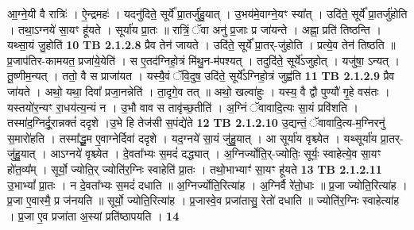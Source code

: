 \documentclass[17pt]{extarticle}
\begin{document}
                  आ॒ग्ने॒यी वै रात्रिः॑ । ऐ॒न्द्रमहः॑ । यदनु॑दिते॒ सूर्ये᳚ प्रा॒तर्जु॑हु॒यात् । उ॒भय॑मे॒वाग्ने॒यꣳ स्या᳚त् । उदि॑ते॒ सूर्ये᳚ प्रा॒तर्जु॑होति । तथा॒ऽग्नये॑ सा॒यꣳ हू॑यते । सूर्या॑य प्रा॒तः ॥ रात्रिं॒ ॅवा अनु॑ प्र॒जाः प्र जा॑यन्ते । अह्ना॒ प्रति॑ तिष्ठन्ति । यथ्सा॒यं जु॒होति॑ \textbf{ 10} \newline
                  \newline
                                \textbf{ TB 2.1.2.8} \newline
                  प्रैव तेन॑ जायते । उदि॑ते॒ सूर्ये᳚ प्रा॒तर्-जु॑होति । प्रत्ये॒व तेन॑ तिष्ठति ॥ प्र॒जाप॑तिर-कामयत॒ प्रजा॑ये॒येति॑ । स ए॒तद॑ग्निहो॒त्रं मि॑थु॒न-म॑पश्यत् । तदुदि॑ते॒ सूर्ये॑ऽजुहोत् । यजु॑षा॒ ऽन्यत् । तू॒ष्णीम॒न्यत् । ततो॒ वै स प्राजा॑यत । यस्यै॒वं ॅवि॒दुष॒ उदि॑ते॒ सूर्ये᳚ऽग्निहो॒त्रं जुह्व॑ति \textbf{ 11} \newline
                  \newline
                                \textbf{ TB 2.1.2.9} \newline
                  प्रैव जा॑यते । अथो॒ यथा॒ दिवा᳚ प्रजा॒नन्नेति॑ । ता॒दृगे॒व तत् ॥ अथो॒ खल्वा॑हुः । यस्य॒ वै द्वौ पुण्यौ॑ गृ॒हे वस॑तः । यस्तयो॑र॒न्यꣳ रा॒धय॑त्य॒न्यं न । उ॒भौ वाव स तावृ॑च्छ॒तीति॑ । अ॒ग्निं ॅवावादि॒त्यः सा॒यं प्रवि॑शति । तस्मा॑द॒ग्निर्दू॒रान्नक्तं॑ ददृशे ।उ॒भे हि तेज॑सी स॒पंद्ये॑ते \textbf{ 12} \newline
                  \newline
                                \textbf{ TB 2.1.2.10} \newline
                  उ॒द्यन्तं॒ ॅवावादि॒त्य-म॒ग्निरनु॑ स॒मारो॑हति । तस्मा᳚द्धू॒म ए॒वाग्नेर्दिवा॑ ददृशे । यद॒ग्नये॑ सा॒यं जु॑हु॒यात् । आ सूर्या॑य वृश्च्येत । यथ्सूर्या॑य प्रा॒तर्-जु॑हु॒यात् । आऽग्नये॑ वृश्च्येत । दे॒वता᳚भ्यः स॒मदं॑ दद्ध्यात् । अ॒ग्निर्ज्योति॒र्-ज्योतिः॒ सूर्यः॒ स्वाहेत्ये॒व सा॒यꣳ हो॑त॒व्य᳚म् । सूर्यो॒ ज्योति॒र् ज्योति॑र॒ग्निः स्वाहेति॑ प्रा॒तः । तथो॒भाभ्याꣳ॑ सा॒यꣳ हू॑यते \textbf{ 13} \newline
                  \newline
                                \textbf{ TB 2.1.2.11} \newline
                  उ॒भाभ्यां᳚ प्रा॒तः । न दे॒वता᳚भ्यः स॒मदं॑ दधाति ॥ अ॒ग्निर्ज्योति॒रित्या॑ह । अ॒ग्निर्वै रे॑तो॒धाः ॥ प्र॒जा ज्योति॒रित्या॑ह । प्र॒जा ए॒वास्मै॒ प्र ज॑नयति ॥ सूर्यो॒ ज्योति॒रित्या॑ह । प्र॒जास्वे॒व प्रजा॑तासु॒ रेतो॑ दधाति ॥ ज्योति॑र॒ग्निः स्वाहेत्या॑ह । प्र॒जा ए॒व प्रजा॑ता अ॒स्यां प्रति॑ष्ठापयति । \textbf{ 14} \newline
                  \newline
\end{document}
